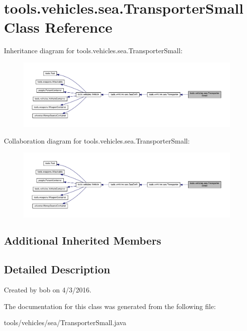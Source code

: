 \hypertarget{classtools_1_1vehicles_1_1sea_1_1_transporter_small}{}\section{tools.\+vehicles.\+sea.\+Transporter\+Small Class Reference}
\label{classtools_1_1vehicles_1_1sea_1_1_transporter_small}


Inheritance diagram for tools.\+vehicles.\+sea.\+Transporter\+Small\+:\nopagebreak
\begin{figure}[H]
\begin{center}
\leavevmode
\includegraphics[width=350pt]{classtools_1_1vehicles_1_1sea_1_1_transporter_small__inherit__graph}
\end{center}
\end{figure}


Collaboration diagram for tools.\+vehicles.\+sea.\+Transporter\+Small\+:\nopagebreak
\begin{figure}[H]
\begin{center}
\leavevmode
\includegraphics[width=350pt]{classtools_1_1vehicles_1_1sea_1_1_transporter_small__coll__graph}
\end{center}
\end{figure}
\subsection*{Additional Inherited Members}


\subsection{Detailed Description}
Created by bob on 4/3/2016. 

The documentation for this class was generated from the following file\+:\begin{DoxyCompactItemize}
\item 
tools/vehicles/sea/Transporter\+Small.\+java\end{DoxyCompactItemize}
